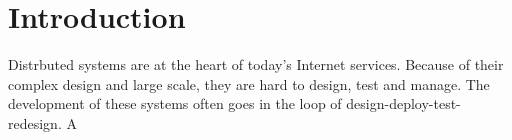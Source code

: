 \section{Introduction}

Distrbuted systems are at the heart of today's Internet
services. Because of their complex design and large scale,
they are hard to design, test and manage. The development of
these systems often goes in the loop of
design-deploy-test-redesign. A 










